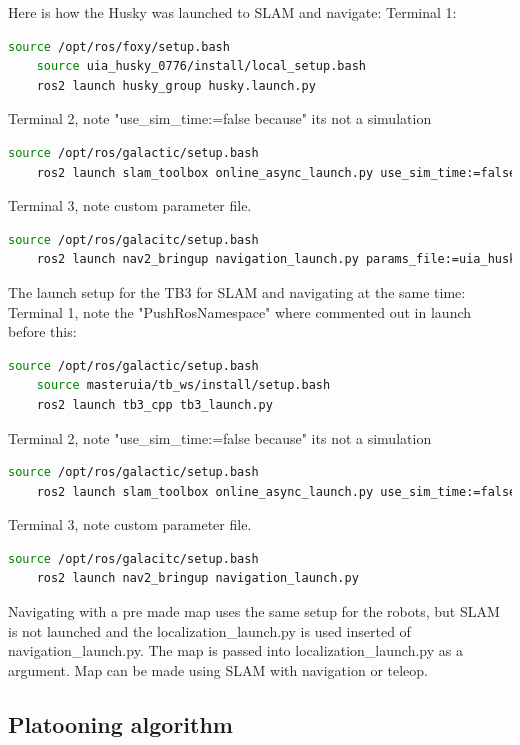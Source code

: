 Here is how the Husky was launched to SLAM and navigate: 
Terminal 1: 
\begin{lstlisting}[language=bash]
    source /opt/ros/foxy/setup.bash
    source uia_husky_0776/install/local_setup.bash
    ros2 launch husky_group husky.launch.py
\end{lstlisting}
Terminal 2, note "use\_sim\_time:=false because" its not a simulation 
\begin{lstlisting}[language=bash]
    source /opt/ros/galactic/setup.bash
    ros2 launch slam_toolbox online_async_launch.py use_sim_time:=false
\end{lstlisting}
Terminal 3, note custom parameter file. 
\begin{lstlisting}[language=bash]
    source /opt/ros/galacitc/setup.bash
    ros2 launch nav2_bringup navigation_launch.py params_file:=uia_husky_0776/husky_group/params/nav2_params.yaml
\end{lstlisting}

The launch setup for the TB3 for SLAM and navigating at the same time: 
Terminal 1, note the "PushRosNamespace" where commented out in launch before this: 
\begin{lstlisting}[language=bash]
    source /opt/ros/galactic/setup.bash
    source masteruia/tb_ws/install/setup.bash
    ros2 launch tb3_cpp tb3_launch.py
\end{lstlisting}
Terminal 2, note "use\_sim\_time:=false because" its not a simulation 
\begin{lstlisting}[language=bash]
    source /opt/ros/galactic/setup.bash
    ros2 launch slam_toolbox online_async_launch.py use_sim_time:=false
\end{lstlisting}
Terminal 3, note custom parameter file. 
\begin{lstlisting}[language=bash]
    source /opt/ros/galacitc/setup.bash
    ros2 launch nav2_bringup navigation_launch.py 
\end{lstlisting}

Navigating with a pre made map uses the same setup for the robots, but SLAM is not launched and the localization\_launch.py is used inserted of navigation\_launch.py. The map is passed into localization\_launch.py as a argument. Map can be made using SLAM with navigation or teleop. 

\subsection{Platooning algorithm} \label{Platooning_algorithm}

